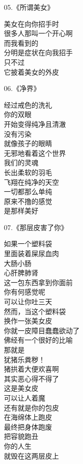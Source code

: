 \begin{multicols}{2}
    \begin{center}
        05.《所谓美女》\it

        美女在向你招手时 \\ 很多人那叫一个开心啊 \\ 而我看到的 \\ 分明是症状在向我招手 \\ 只不过 \\ 它披着美女的外皮
    \end{center}

    \begin{center}
        06.《净界》\it

        经过戒色的洗礼 \\ 你的双眼 \\ 开始变得纯净且清澈 \\ 没有污染 \\ 就像孩子的眼睛 \\ 无邪地看着这个世界 \\ 我们的灵魂 \\ 长出柔软的羽毛 \\ 飞翔在纯净的天空 \\ 一切都那么单纯 \\ 原来不撸的感觉 \\ 是那样美好
    \end{center}

    \begin{center}
        07.《那层皮害了你》\it

        如果一个塑料袋 \\ 里面装着屎尿血肉 \\ 大肠小肠 \\ 心肝脾肺肾 \\ 这一包东西拿到你面前 \\ 你有何感觉呢 \\ 可以让你吐三天 \\ 然而，当这个塑料袋 \\ 换作一张美女皮 \\ 你就一皮障目蠢蠢欲动了 \\ 佛经有一个很好的比喻 \\ 那就是 \\ 犹猪乐粪秽！ \\ 猪拱着大便欢喜啊 \\ 其实恶心得不得了 \\ 这是美女皮 \\ 可以让人着魔 \\ 还有就是你的包皮 \\ 在海绵体上跑皮 \\ 最终把身体跑废 \\ 把容貌跑丑 \\ 你的人生 \\ 就毁在这两层皮上
    \end{center}


\end{multicols}
